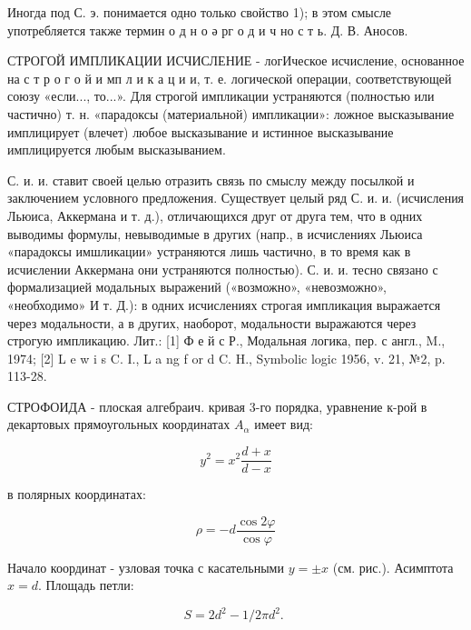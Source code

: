 \documentclass[10pt]{article}
\begin{document}
Иногда под С. э. понимается одно только свойство 1); в этом смысле употребляется также термин о д н о ә рг о д и ч но с т ь. Д. В. Аносов.



СТРОГОЙ ИМПЛИКАЦИИ ИСЧИСЛЕНИЕ - логИческое исчисление, основанное на с т р о г о й и мп л и к а ц и и, т. е. логической операции, соответствующей союзу «если..., то...». Для строгой импликации устраняются (полностью или частично) т. н. «парадоксы (материальной) импликации»: ложное высказывание имплицирует (влечет) любое высказывание и истинное высказывание имплицируется любым высказыванием.



С. и. и. ставит своей целью отразить связь по смыслу между посылкой и заключением условного предложения. Существует целый ряд С. и. и. (исчисления Льюиса, Аккермана и т. д.), отличающихся друг от друга тем, что в одних выводимы формулы, невыводимые в других (напр., в исчислениях Льюиса «парадоксы имшликации» устраняются лишь частично, в то время как в исчиєлении Аккермана они устраняются полностью). С. и. и. тесно связано с формализацией модальных выражений («возможно», «невозможно», «необходимо» И т. Д.): в одних исчислениях строгая импликация выражается через модальности, а в других, наоборот, модальности выражаются через строгую импликацию. Лит.: [1] Ф е й с Р., Модальная логика, пер. с англ., M., 1974; [2] L e w i s C. I., L a ng f or d C. H., Symbolic logic 1956, v. 21, №2, p. 113-28.



СТРОФОИДА - плоская алгебраич. кривая 3-го порядка, уравнение к-рой в декартовых прямоугольных координатах $A_{\alpha}$ имеет вид:



\[

y^{2}=x^{2} \frac{d+x}{d-x}

\]



в полярных координатах:



\[

\rho=-d \frac{\cos 2 \varphi}{\cos \varphi}

\]



Начало координат - узловая точка с касательными $y= \pm x$ (см. рис.). Асимптота $x=d$. Площадь петли:



\[

S=2 d^{2}-1 / 2 \pi d^{2} \text {. }

\]
\end{document}
